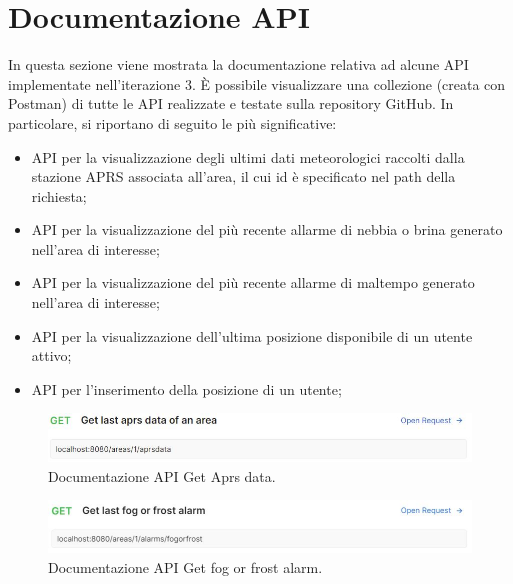 \clearpage

\section{Documentazione API}

In questa sezione viene mostrata la documentazione relativa ad alcune API implementate nell'iterazione 3. \`E possibile visualizzare una collezione (creata con Postman) di tutte le API realizzate e testate sulla repository GitHub. In particolare, si riportano di seguito le più significative:
\begin{itemize}
	\item API per la visualizzazione degli ultimi dati meteorologici raccolti dalla stazione APRS associata all'area, il cui id è specificato nel path della richiesta;
	\item API per la visualizzazione del più recente allarme di nebbia o brina generato nell'area di interesse;
	\item API per la visualizzazione del più recente allarme di maltempo generato nell'area di interesse;
	\item API per la visualizzazione dell'ultima posizione disponibile di un utente attivo;
	\item API per l'inserimento della posizione di un utente;
\end{itemize}

\begin{figure}[h!]
	\centering
	\includegraphics[width=1\linewidth]{./Iterazione 3/ImageFiles/GetAprsDataRequest}
	
	\caption{Documentazione API Get Aprs data.}
	\label{fig:GetAprsDataAPI}
\end{figure}

\begin{figure}[h!]
	\centering
	\includegraphics[width=1\linewidth]{./Iterazione 3/ImageFiles/GetFrostOrFogAlarmRequest}
	
	\caption{Documentazione API Get fog or frost alarm.}
	\label{fig:GetFrostOrFogAlarm}
\end{figure}

